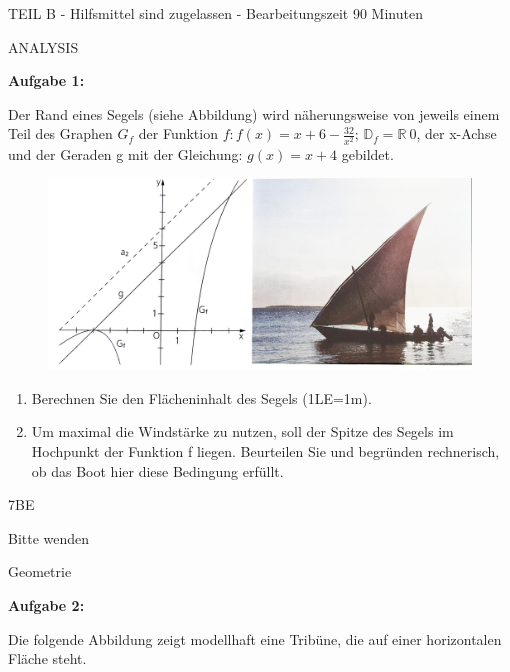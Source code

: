 \documentclass[a4paper,12pt]{article}
\newcommand{\Aufgabe}[1]{
  {
  \vspace*{0.5cm}
  \textsf{\textbf{Aufgabe #1}}
  \vspace*{0.2cm}
  
  }
}
\begin{document}



\vspace{0,5cm} {TEIL B} -  Hilfsmittel sind zugelassen - Bearbeitungszeit 90 Minuten

\vspace {0,2cm}
ANALYSIS

\Aufgabe {1:} 
Der Rand eines Segels (siehe Abbildung) wird näherungsweise von jeweils einem Teil des Graphen $G_f$ der Funktion $f: f(x)=x+6-\frac{32}{x^2}$;
$ \mathbb{D}_f= \mathbb{R}\  {0}$, der x-Achse und der Geraden g mit der Gleichung: $g(x)=x+4$ gebildet.

\begin{figure}[h!]
  \begin{center}
    \includegraphics[width=0.8\linewidth]{bols201202.jpeg}
  \end{center}
\end{figure}

\begin{enumerate}[label={\alph*)}]
\item Berechnen Sie den Flächeninhalt des Segels (1LE=1m).
\item Um maximal die Windstärke zu nutzen, soll der Spitze des Segels im Hochpunkt der Funktion f liegen. Beurteilen Sie und begründen rechnerisch, ob das Boot hier diese Bedingung erfüllt. 
\end{enumerate}  
\begin{flushright}7BE \end{flushright}
\begin{flushright}Bitte wenden \end{flushright}
\newpage

\vspace {0,2cm}
Geometrie 
\Aufgabe{2:} 
Die folgende Abbildung zeigt modellhaft eine Tribüne, die auf einer horizontalen Fläche steht.
\end{document}
